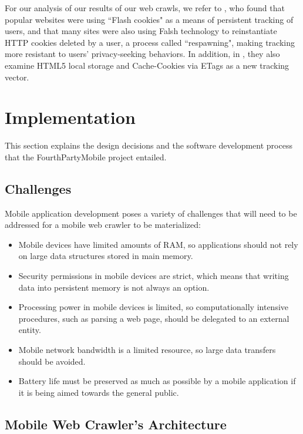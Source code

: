 \documentclass{acm_proc_article-sp}
\begin{document}
For our analysis of our results of our \fpm web crawls, we refer to \cite{FLASH_COOKIES,soltani}, who found that popular websites were using ``Flash cookies" as a means of persistent tracking of users, and that many sites were also using Falsh technology to reinstantiate HTTP cookies deleted by a user, a process called ``respawning", making tracking more resistant to users’ privacy-seeking behaviors. In addition, in \cite{FLASH_COOKIES}, they also examine HTML5 local storage and Cache-Cookies via ETags as a new tracking vector.

\section{Implementation}
This section explains the design decisions and the software development process that the FourthPartyMobile project entailed.

\subsection{Challenges}
Mobile application development poses a variety of challenges that will need to be addressed for a mobile web crawler to be materialized:

\begin{itemize}
\item Mobile devices have limited amounts of RAM, so applications should not rely on large data structures stored in main memory.

\item Security permissions in mobile devices are strict, which means that writing data into persistent memory is not always an option.

\item Processing power in mobile devices is limited, so computationally intensive procedures, such as parsing a web page, should be delegated to an external entity.

\item Mobile network bandwidth is a limited resource, so large data transfers should be avoided.

\item Battery life must be preserved as much as possible by a mobile application if it is being aimed towards the general public.
\end{itemize}


\subsection{Mobile Web Crawler's Architecture}
\end{document}
